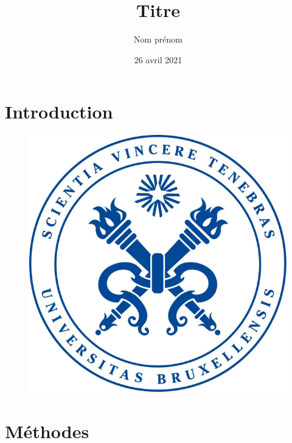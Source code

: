 \documentclass[utf8]{article}
\title{Titre}
\author{Nom prénom}
\date{26 avril 2021}
\begin{document}
\maketitle
\tableofcontents

\newpage


\section{Introduction}


\begin{figure}[H]
  \centering
	\includegraphics[scale=0.4]{img/logo.png}
  \label{fig:logo}
\end{figure}

\section{Méthodes}

\begin{figure}[H]
\begin{minipage}{\textwidth}
  \centering
	
  \label{fig:code_exemple}
\end{minipage}
\end{figure}
\end{document}
